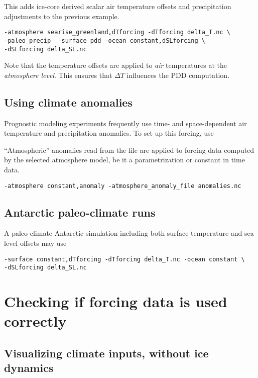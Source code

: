 \documentclass[titlepage,letterpaper,final]{scrartcl}
\def\optsection#1{%
  \def\optindex##1{\index[options]{#1!##1}}
  \def\optseealso##1{\index[options]{#1|see{##1}}}
}
\begin{document}
This adds ice-core derived scalar air temperature offsets and precipitation
adjustments to the previous example.

\begin{verbatim}
-atmosphere searise_greenland,dTforcing -dTforcing delta_T.nc \
-paleo_precip  -surface pdd -ocean constant,dSLforcing \
-dSLforcing delta_SL.nc
\end{verbatim}

Note that the temperature offsets are applied to \emph{air} temperatures at the
\emph{atmosphere level}. This ensures that $\Delta T$ influences the PDD
computation.

\subsection{Using climate anomalies}
\label{sec:climate-anomalies}

Prognostic modeling experiments frequently use time- and space-dependent
air temperature and precipitation anomalies. To set up this forcing, use

``Atmospheric'' anomalies read from the file are applied to forcing data
computed by the selected atmosphere model, be it a parametrization or constant
in time data.
\begin{verbatim}
-atmosphere constant,anomaly -atmosphere_anomaly_file anomalies.nc
\end{verbatim}

\subsection{Antarctic paleo-climate runs}
\label{sec:paleo-climate}

A paleo-climate Antarctic simulation including both surface temperature and sea
level offsets may use
\begin{verbatim}
-surface constant,dTforcing -dTforcing delta_T.nc -ocean constant \
-dSLforcing delta_SL.nc
\end{verbatim}

\section{Checking if forcing data is used correctly}
\label{sec:checking-forcing}


\subsection{Visualizing climate inputs, without ice dynamics}
\label{sec:pclimate}
\optsection{\texttt{pclimate} options}
\end{document}
